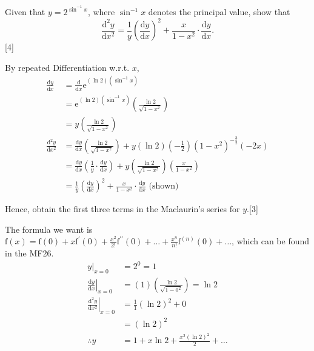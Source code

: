 \documentclass[12pt, a4 paper]{article}
\begin{document}
\begin{outline}[enumerate]
 \1 Given that \(y=2^{\sin^{-1}{x}}\), where \(\sin^{-1}{x}\) denotes the principal value, show that
 \begin{equation*}
  \dfrac{\mathrm{d}^2y}{\mathrm{d}x^2}=\dfrac{1}{y}{\left(\dfrac{\mathrm{d}y}{\mathrm{d}x}\right)}^2+\dfrac{x}{1-x^2}\cdot \dfrac{\mathrm{d}y}{\mathrm{d}x}.
 \end{equation*}\hfill[4] \\
 \begin{answer}
   By repeated Differentiation w.r.t. $x$,
   \begin{align*}
     \frac{\mathrm{d}y}{\mathrm{d}x}&=\frac{\mathrm{d}}{\mathrm{d}x}\mathrm{e}^{(\ln{2})(\sin^{-1}{x})}\\
     &= \mathrm{e}^{(\ln{2})(\sin^{-1}{x})}\left(\frac{\ln{2}}{\sqrt{1-x^2}}\right) \\
     &= y\left(\frac{\ln{2}}{\sqrt{1-x^2}}\right)\\
     \frac{\mathrm{d}^2y}{\mathrm{d}x^2} &= \frac{\mathrm{d}y}{\mathrm{d}x}\left(\frac{\ln{2}}{\sqrt{1-x^2}}\right) + y(\ln{2})\left(-\frac{1}{2}\right)(1-x^2)^{-\frac{3}{2}}(-2x) \\
     &= \frac{\mathrm{d}y}{\mathrm{d}x}\left(\frac{1}{y}\cdot\frac{\mathrm{d}y}{\mathrm{d}x}\right) + y\left(\frac{\ln{2}}{\sqrt{1-x^2}}\right)\left(\frac{x}{1-x^2}\right) \\
     &= \frac{1}{y}{\left(\frac{\mathrm{d}y}{\mathrm{d}x}\right)}^2+\frac{x}{1-x^2}\cdot \frac{\mathrm{d}y}{\mathrm{d}x} \textrm{ (shown)}
   \end{align*}
 \end{answer}
 Hence, obtain the first three terms in the Maclaurin's series for \(y\).\hfill[3] %
 \begin{answer}
 The formula we want is $\textrm{f}(x)=\textrm{f}(0)+x\textrm{f}^{\prime}(0)+\frac{x^2}{2!}\textrm{f}^{\prime \prime}(0)+\dots+\frac{x^n}{n!}\textrm{f}^{(n)}(0)+\dots$, which can be found in the MF26.
   \begin{align*}
     \left.y\right|_{x=0}&=2^0=1 \\
     \left.\frac{\mathrm{d}y}{\mathrm{d}x}\right|_{x=0}&=(1)\left(\frac{\ln{2}}{\sqrt{1-0^2}}\right) = \ln{2} \\
     \left.\frac{\mathrm{d}^2y}{\mathrm{d}x^2}\right|_{x=0}&=\frac{1}{1}(\ln{2})^2+0 \\
     &= (\ln{2})^2\\
     \therefore y &= 1 + x\ln{2} + \frac{x^2(\ln{2})^2}{2} + \dots
   \end{align*}
 \end{answer}


\end{outline}
\end{document}
